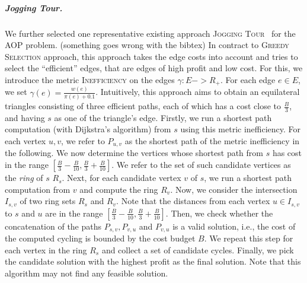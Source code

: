\documentclass[sigconf,natbib=false]{acmart}
\newcommand{\greedy}{\textsc{Greedy Selection}\xspace}
\newcommand{\jogging}{\textsc{Jogging Tour}\xspace}
\newcommand{\AOP}{\textsc{AOP}\xspace}
\begin{document}
\subparagraph*{\textbf{Jogging Tour.}}
We further selected one representative existing approach \jogging~\cite{DBLP:conf/wea/GemsaPWZ13} for the \AOP problem.  (something goes wrong with the bibtex)
In contract to \greedy approach, this approach takes the edge costs into account and  tries to select the ``efficient'' edges, that are edges of high profit and low cost. 
For this, we introduce the metric \textsc{Inefficiency} \xspace on the edges $\gamma: E-> R_{+}$. For each edge $e \in E$, we set $\gamma(e) = \frac{w(e)}{\pi(e) + 0.1}$.
Intuitively, this approach aims to obtain an equilateral triangles consisting of three efficient paths, each of which has a cost close to  $\frac{B}{3}$, and having $s$ as one of the triangle's edge. Firstly, we run a shortest path computation (with Dijkstra’s algorithm) from $s$
using this metric inefficiency.
For each vertex $u,v$, we refer to $P_{u,v}$ as the shortest path of the metric inefficiency in the following.   
We now determine the vertices whose shortest path from $s$ has cost in the range $[\frac{B}{3}- \frac{B}{10} , \frac{B}{3} + \frac{B}{10}]$. We refer to the set of such candidate vertices as the \textit{ring} of $s$ $R_s$.
Next, for each candidate vertex $v$ of $s$, we run a shortest path computation from $v$ and compute the ring $R_v$. Now, we consider the intersection $I_{s,v}$ of two ring sets $R_s$ and $R_v$. Note that the distances from each vertex $u\in I_{s,v}$ to $s$ and $u$ are in the range $[\frac{B}{3}- \frac{B}{10} , \frac{B}{3} + \frac{B}{10}]$. Then, we check whether the concatenation of the paths $P_{s,v}, P_{v,u}$ and $P_{v,u}$ is a valid solution, i.e., the cost of the computed cycling is bounded by the cost budget $B$. 
We repeat this step for each vertex in the ring $R_s$ and collect a set of candidate cycles. 
Finally, we pick the candidate solution with the highest profit as the final solution.
Note that this algorithm may not find any feasible solution.
       
\end{document}
